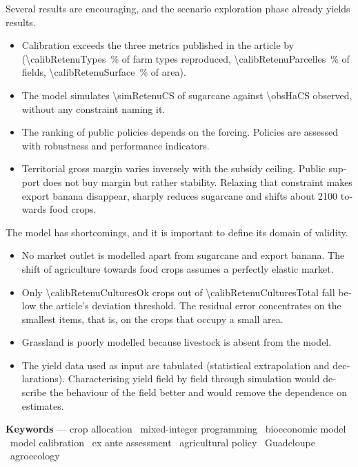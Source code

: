 \begin{otherlanguage}{english}
Several results are encouraging, and the scenario exploration phase already yields results.
\begin{itemize}
\item Calibration exceeds the three metrics published in the article by \textcite{chopin2015}
(\SI{\calibRetenuTypes}{\percent} of farm types reproduced,
\SI{\calibRetenuParcelles}{\percent} of fields, \SI{\calibRetenuSurface}{\percent} of area).
\item The model simulates \SI{\simRetenuCS}{\ha} of sugarcane against \SI{\obsHaCS}{\ha} observed,
without any constraint naming it.
\item The ranking of public policies depends on the forcing. Policies are assessed with robustness
and performance indicators.
\item Territorial gross margin varies inversely with the subsidy ceiling. Public support does not buy
margin but rather stability. Relaxing that constraint makes export banana disappear, sharply
reduces sugarcane and shifts about \SI{2100}{\ha} towards food crops.
\end{itemize}

The model has shortcomings, and it is important to define its domain of validity.
\begin{itemize}
\item No market outlet is modelled apart from sugarcane and export banana. The shift of agriculture
towards food crops assumes a perfectly elastic market.
\item Only \num{\calibRetenuCulturesOk} crops out of \num{\calibRetenuCulturesTotal} fall below
the article's deviation threshold. The residual error
concentrates on the smallest items, that is, on the crops that occupy a small area.
\item Grassland is poorly modelled because livestock is absent from the model.
\item The yield data used as input are tabulated (statistical extrapolation and declarations).
Characterising yield field by field through simulation would describe the behaviour of the field
better and would remove the dependence on estimates.
\end{itemize}

\vfill
\noindent\textbf{Keywords} — crop allocation \textperiodcentered\ mixed-integer programming
\textperiodcentered\ bioeconomic model \textperiodcentered\ model calibration
\textperiodcentered\ ex ante assessment \textperiodcentered\ agricultural policy
\textperiodcentered\ Guadeloupe \textperiodcentered\ agroecology

\end{otherlanguage}
